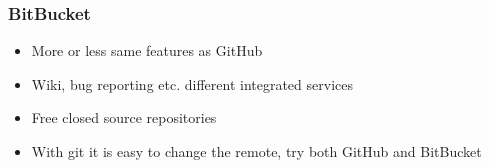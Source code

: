 \begin{frame}
	\frametitle{BitBucket}
		\begin{itemize}[<+->]
			\item More or less same features as GitHub
			\item Wiki, bug reporting etc. different integrated services
			\item Free closed source repositories
			\item With git it is easy to change the remote, try both GitHub and BitBucket
		\end{itemize}
\end{frame}
